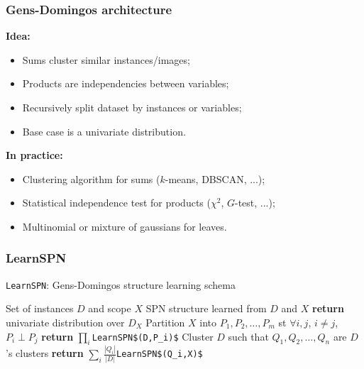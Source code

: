 \documentclass{beamer}
\newcommand{\indep}{\perp}
\newcommand{\code}[1]{\lstinline[mathescape=true]{#1}}
\newcommand{\mcode}[1]{\lstinline[mathescape]!#1!}
\begin{document}
\begin{frame}
  \frametitle{Gens-Domingos architecture}

  \textbf{Idea:}\\
  \begin{itemize}
    \item Sums cluster similar instances/images;
    \item Products are independencies between variables;
    \item Recursively split dataset by instances or variables;
    \item Base case is a univariate distribution.
  \end{itemize}

  \textbf{In practice:}\\
  \begin{itemize}
    \item Clustering algorithm for sums ($k$-means, DBSCAN, ...);
    \item Statistical independence test for products ($\chi^2$, $G$-test, ...);
    \item Multinomial or mixture of gaussians for leaves.
  \end{itemize}
\end{frame}

\begin{frame}
  \frametitle{LearnSPN}

  \begin{algorithm}[H]
    \caption{\code{LearnSPN}: Gens-Domingos structure learning schema}
    \begin{algorithmic}[1]
      \Require Set of instances $D$ and scope $X$
      \Ensure SPN structure learned from $D$ and $X$
        \State \textbf{return} univariate distribution over $D_X$
      \EndIf%
      \State Partition $X$ into $P_1,P_2,\ldots,P_m$ st $\forall i, j$, $i\neq j$, $P_i\indep P_j$
        \State \textbf{return} $\prod_i$\mcode{LearnSPN$(D,P_i)$}
      \EndIf%
      \State Cluster $D$ such that $Q_1,Q_2,\ldots,Q_n$ are $D$'s clusters
      \State \textbf{return} $\sum_i\frac{|Q_i|}{|D|}$\mcode{LearnSPN$(Q_i,X)$}
    \end{algorithmic}
  \end{algorithm}
\end{frame}
\end{document}
